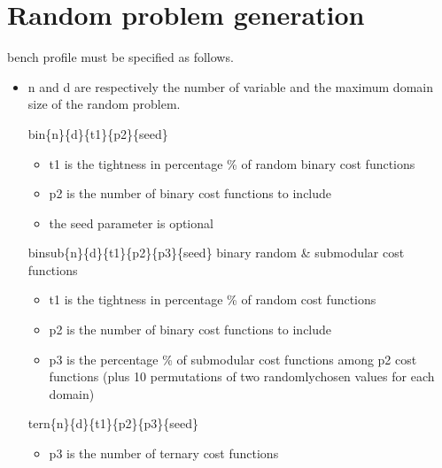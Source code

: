 \documentclass[letterpaper,10pt,openany,oneside,english]{sphinxmanual}
\begin{document}
\section{Random problem generation}
\label{\detokenize{userdoc:random-problem-generation}}\begin{description}
\sphinxAtStartPar
bench profile must be specified as follows.
\begin{itemize}
\item {} 
\sphinxAtStartPar
n and d are respectively the number of variable and the
maximum domain size of the random problem.

\sphinxAtStartPar
bin\sphinxhyphen{}\{n\}\sphinxhyphen{}\{d\}\sphinxhyphen{}\{t1\}\sphinxhyphen{}\{p2\}\sphinxhyphen{}\{seed\}
\begin{itemize}
\item {} 
\sphinxAtStartPar
t1 is the tightness in percentage \% of random binary cost
functions

\item {} 
\sphinxAtStartPar
p2 is the number of binary cost functions to include

\item {} 
\sphinxAtStartPar
the seed parameter is optional

\end{itemize}

\sphinxAtStartPar
binsub\sphinxhyphen{}\{n\}\sphinxhyphen{}\{d\}\sphinxhyphen{}\{t1\}\sphinxhyphen{}\{p2\}\sphinxhyphen{}\{p3\}\sphinxhyphen{}\{seed\} binary random \& submodular
cost functions
\begin{itemize}
\item {} 
\sphinxAtStartPar
t1 is the tightness in percentage \% of random cost functions

\item {} 
\sphinxAtStartPar
p2 is the number of binary cost functions to include

\item {} 
\sphinxAtStartPar
p3 is the percentage \% of submodular cost functions among p2
cost functions
(plus 10 permutations of two randomly\sphinxhyphen{}chosen values for each
domain)

\end{itemize}

\sphinxAtStartPar
tern\sphinxhyphen{}\{n\}\sphinxhyphen{}\{d\}\sphinxhyphen{}\{t1\}\sphinxhyphen{}\{p2\}\sphinxhyphen{}\{p3\}\sphinxhyphen{}\{seed\}
\begin{itemize}
\item {} 
\sphinxAtStartPar
p3 is the number of ternary cost functions


\end{itemize}
\end{itemize}
\end{description}
\end{document}
